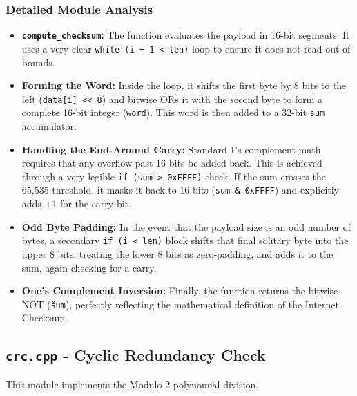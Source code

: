 \documentclass[12pt, a4paper]{article}
\begin{document}
\subsubsection{Detailed Module Analysis}
\begin{itemize}
    \item \textbf{\texttt{compute\_checksum}:} The function evaluates the payload in 16-bit segments. It uses a very clear \texttt{while (i + 1 < len)} loop to ensure it does not read out of bounds. 
    \item \textbf{Forming the Word:} Inside the loop, it shifts the first byte by 8 bits to the left (\texttt{data[i] << 8}) and bitwise ORs it with the second byte to form a complete 16-bit integer (\texttt{word}). This word is then added to a 32-bit \texttt{sum} accumulator.
    \item \textbf{Handling the End-Around Carry:} Standard 1's complement math requires that any overflow past 16 bits be added back. This is achieved through a very legible \texttt{if (sum > 0xFFFF)} check. If the sum crosses the 65,535 threshold, it masks it back to 16 bits (\texttt{sum \& 0xFFFF}) and explicitly adds $+1$ for the carry bit. 
    \item \textbf{Odd Byte Padding:} In the event that the payload size is an odd number of bytes, a secondary \texttt{if (i < len)} block shifts that final solitary byte into the upper 8 bits, treating the lower 8 bits as zero-padding, and adds it to the sum, again checking for a carry.
    \item \textbf{One's Complement Inversion:} Finally, the function returns the bitwise NOT (\texttt{\~sum}), perfectly reflecting the mathematical definition of the Internet Checksum.
\end{itemize}

\subsection{\texttt{crc.cpp} - Cyclic Redundancy Check}
This module implements the Modulo-2 polynomial division.
\end{document}
